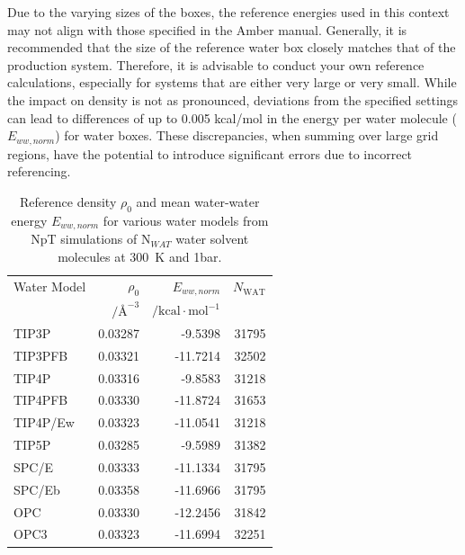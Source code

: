 \documentclass[9pt,tutorial]{livecoms}
\begin{document}
Due to the varying sizes of the boxes, the reference energies used in this context may not align with those specified in the Amber manual. Generally, it is recommended that the size of the reference water box closely matches that of the production system. Therefore, it is advisable to conduct your own reference calculations, especially for systems that are either very large or very small. While the impact on density is not as pronounced, deviations from the specified settings can lead to differences of up to 0.005 kcal/mol in the energy per water molecule ($E_{ww, norm}$) for water boxes. These discrepancies, when summing over large grid regions, have the potential to introduce significant errors due to incorrect referencing.

\begin{table}[h]
	\caption{Reference density $\rho_0$ and mean water-water energy $E_{ww, norm}$ for various water models from NpT simulations of N$_{WAT}$ water solvent molecules at \SI{300}{\kelvin} and 1bar.}\label{tab:ref_densities}
	\small
	\begin{tabularx}{\columnwidth}{@{}lrrr@{}}
		\toprule
		Water Model       & $\rho_0$ & $E_{ww, norm}$ & $N_\text{WAT}$ \\
        & $/\text{\AA}^{-3}$ & $/\text{kcal}\cdot \text{mol}^{-1}$ & \\
		\midrule
		TIP3P \cite{Jorgensen1983-tip3p}    & 0.03287 & -9.5398   & 31795 \\
		TIP3PFB \cite{Wang2014-tip3p-force-balance}  & 0.03321 & -11.7214  & 32502 \\
		TIP4P \cite{Jorgensen1985-tip4p}    & 0.03316 & -9.8583   & 31218 \\
       TIP4PFB \cite{Wang2014-tip3p-force-balance} & 0.03330 & -11.8724   & 31653 \\
		TIP4P/Ew \cite{Horn2004-tip4pew} & 0.03323 & -11.0541  & 31218 \\
		TIP5P \cite{Mahoney2000-tip5p}    & 0.03285 & -9.5989   & 31382 \\
		SPC/E \cite{Berendsen1987-spce}    & 0.03333 & -11.1334  & 31795 \\
       SPC/Eb \cite{Takemura2012-spceb}   & 0.03358 & -11.6966 & 31795 \\
		OPC \cite{Izadi2014-opc}      & 0.03330 & -12.2456 & 31842 \\
		OPC3 \cite{Izadi2016-opc3}     & 0.03323 & -11.6994 & 32251 \\
		\bottomrule
	\end{tabularx}
\end{table}
 
\end{document}
